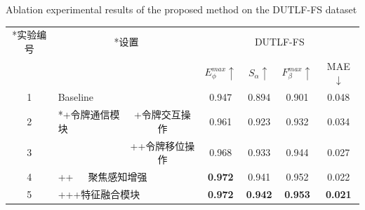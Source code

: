 \begin{table}[t]
	{Ablation experimental results of the proposed method on the DUTLF-FS dataset}
	\centering
	\label{table:abl_total}
	\label{chpt3:table:abl_total}
		\begin{tabular}{cllcccc}
			\toprule[2pt]  %
			
			\multicolumn{1}{c}{ \multirow{2}*{实验编号}} 
			& \multicolumn{2}{c}{ \multirow{2}*{设置}}	
			& \multicolumn{4}{c}{DUTLF-FS} \\
			
			\cmidrule(r){4-7} 
			
			& & & $E_{\phi}^{max}\uparrow$ & $S_{\alpha }\uparrow $ & $F_{\beta}^{max}\uparrow$ & MAE$\downarrow$ \\
			
			
			\midrule
			
			1 & \multicolumn{2}{l}{ Baseline }     & 0.947 & 0.894 & 0.901 & 0.048 \\ 
			
			
			\midrule
			
			2 & \multicolumn{1}{l}{ \multirow{2}*{+令牌通信模块}}	
			
			& \multicolumn{1}{c}{+令牌交互操作}  & 0.961 & 0.923 & 0.932 & 0.034 \\ 
			3 & & \multicolumn{1}{c}{++令牌移位操作} & 0.968 & 0.933 & 0.944 & 0.027 \\
			
			\midrule
			
			4 & \multicolumn{2}{l}{++~~~聚焦感知增强} 		
			& \textbf{0.972} & 0.941 & 0.952 & 0.022 \\
			
			5 & \multicolumn{2}{l}{+++特征融合模块} 		
			& \textbf{0.972} & \textbf{0.942} & \textbf{0.953} & \textbf{0.021} \\ 
			
			
			\bottomrule[2pt]
		\end{tabular}
\end{table}


